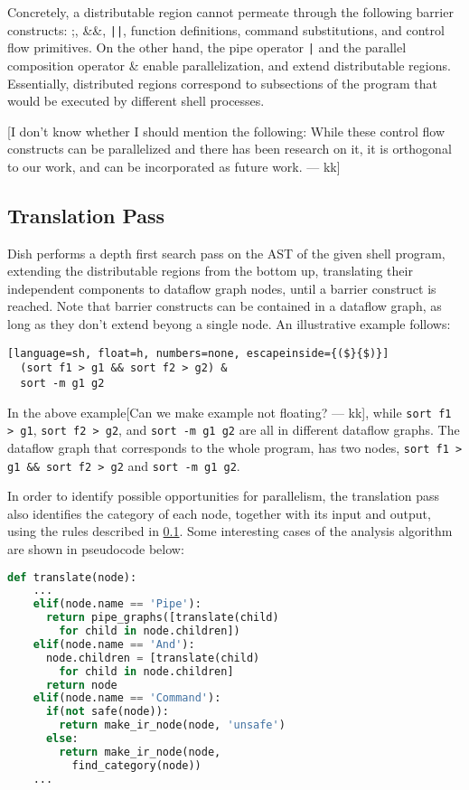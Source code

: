 \documentclass[sigplan,10pt,review,anonymous]{acmart}
\newcommand{\ttt}[1]{\texttt{\small #1}}
\newcommand{\kk}[1]{[{\color{magenta}#1 --- kk}]}
\begin{document}
Concretely, a distributable region cannot permeate through the
following barrier constructs: ;, \&\&, \ttt{||}, function
definitions, command substitutions, and control flow primitives. On
the other hand, the pipe operator \ttt{|} and the parallel
composition operator \& enable parallelization, and extend
distributable regions. Essentially, distributed regions correspond to
subsections of the program that would be executed by different shell
processes.

\kk{I don't know whether I should mention the following: While these
  control flow constructs can be parallelized and there has been
  research on it, it is orthogonal to our work, and can be
  incorporated as future work.}

\subsection{Translation Pass}

Dish performs a depth first search pass on the AST of the given shell
program, extending the distributable regions from the bottom up,
translating their independent components to dataflow graph
nodes, until a barrier construct is reached. Note that barrier
constructs can be contained in a dataflow graph, as long as they don't
extend beyong a single node. An illustrative example follows:

\begin{lstlisting}[language=sh, float=h, numbers=none, escapeinside={($}{$)}]
  (sort f1 > g1 && sort f2 > g2) &
  sort -m g1 g2
\end{lstlisting}

In the above example\kk{Can we make example not floating?}, while
\ttt{sort f1 > g1}, \ttt{sort f2 > g2}, and \ttt{sort -m g1
  g2} are all in different dataflow graphs. The dataflow graph that
corresponds to the whole program, has two nodes, \ttt{sort f1 > g1
  \&\& sort f2 > g2} and \ttt{sort -m g1 g2}.

In order to identify possible opportunities for parallelism, the
translation pass also identifies the category of each node, together
with its input and output, using the rules described in \ref{}. Some
interesting cases of the analysis algorithm are shown in pseudocode
below:

\begin{lstlisting}[language=python, float=h]
  def translate(node):
    ...
    elif(node.name == 'Pipe'):
      return pipe_graphs([translate(child)
        for child in node.children])
    elif(node.name == 'And'):
      node.children = [translate(child)
        for child in node.children]
      return node
    elif(node.name == 'Command'):
      if(not safe(node)):
        return make_ir_node(node, 'unsafe')
      else:
        return make_ir_node(node,
          find_category(node))
    ...
\end{lstlisting}
\end{document}
